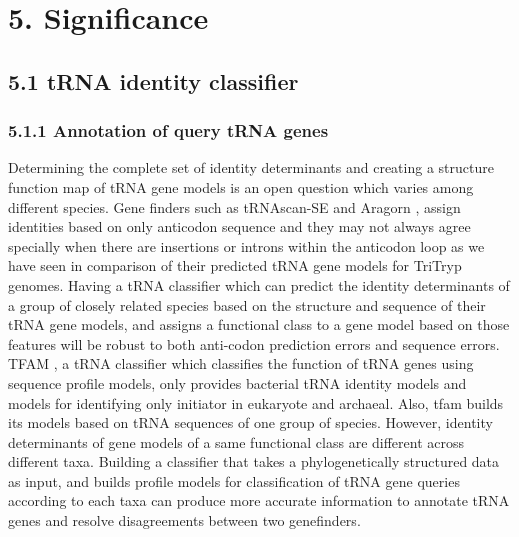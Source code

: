 \documentclass[
12pt, %
a4paper, %
oneside, %
headinclude,footinclude, %
BCOR5mm, %
]{scrartcl}
\begin{document}
\section{5. Significance}

\subsection{\textbf{5.1 tRNA identity classifier}}
\subsubsection*{5.1.1 Annotation of query tRNA genes}
Determining the complete set of identity determinants and creating a structure function map of tRNA gene models is an open question which varies among different species. Gene finders such as tRNAscan-SE \cite{trnascan} and Aragorn \cite{aragorn}, assign identities based on only anticodon sequence and they may not always agree specially when there are insertions or introns within the anticodon loop \cite{PadillaIntron} as we have seen in comparison of their predicted tRNA gene models for TriTryp genomes. Having a tRNA classifier which can predict the identity determinants of a group of closely related species based on the structure and sequence of their tRNA gene models, and assigns a functional class to a gene model based on those features will be robust to both anti-codon prediction errors and sequence errors. TFAM \cite{tfam}, a tRNA classifier which classifies the function of tRNA genes using sequence profile models, only provides bacterial tRNA identity models and models for identifying only initiator in eukaryote and archaeal. Also, tfam builds its models based on tRNA sequences of one group of species. However, identity determinants of gene models of a same functional class are different across different taxa. Building a classifier that takes a phylogenetically structured data as input, and builds profile models for classification of tRNA gene queries according to each taxa can produce more accurate information to annotate tRNA genes and resolve disagreements between two genefinders.



\end{document}
